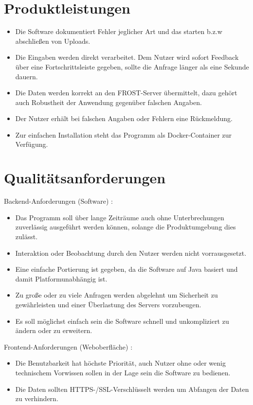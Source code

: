 \documentclass[12 pt]{article}
\begin{document}
	\section{Produktleistungen}
	\begin{itemize}
		\item Die Software dokumentiert Fehler jeglicher Art und das starten b.z.w abschließen von Uploads.
		\item Die Eingaben werden direkt verarbeitet. Dem Nutzer wird sofort Feedback über eine Fortschrittsleiste gegeben, sollte die Anfrage länger als eine Sekunde dauern.
		\item Die Daten werden korrekt an den FROST-Server übermittelt, dazu gehört auch Robustheit der Anwendung gegenüber falschen Angaben.
		\item Der Nutzer erhält bei falschen Angaben oder Fehlern eine Rückmeldung.
		\item Zur einfachen Installation steht das Programm als Docker-Container zur Verfügung.
	\end{itemize}
	
	
	\section{Qualitätsanforderungen}
	Backend-Anforderungen (Software) :
	\begin{itemize}
	\item Das Programm soll über lange Zeiträume auch ohne Unterbrechungen zuverlässig ausgeführt werden können, solange die Produktumgebung dies zulässt.
	\item Interaktion oder Beobachtung durch den Nutzer werden nicht vorrausgesetzt.
	\item Eine einfache Portierung ist gegeben, da die Software auf Java basiert und damit Platformunabhängig ist. 
	\item Zu große oder zu viele Anfragen werden abgelehnt um Sicherheit zu gewährleisten und einer Überlastung des Servers vorzubeugen.
	\item Es soll möglichst einfach sein die Software schnell und unkompliziert zu ändern oder zu erweitern.
	\end{itemize}
	Frontend-Anforderungen (Weboberfläche) :
	\begin{itemize}
	\item Die Benutzbarkeit hat höchste Priorität, auch Nutzer ohne oder wenig technischem Vorwissen sollen in der Lage sein die Software zu bedienen.
	\item Die Daten sollten HTTPS-/SSL-Verschlüsselt werden um Abfangen der Daten zu verhindern.
	\end{itemize}
	
\end{document}
